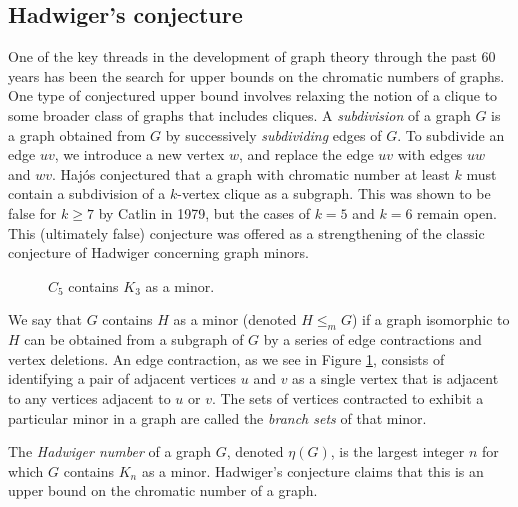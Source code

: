\subsection{Hadwiger's conjecture}

 One of the key threads in the development of graph theory through the past 60 years has been the search for upper bounds on the chromatic numbers of graphs.  One type of conjectured upper bound involves relaxing the notion of a clique to some broader class of graphs that includes cliques.  A {\it subdivision} of a graph $G$ is a graph obtained from $G$ by successively {\it subdividing} edges of $G$.  To subdivide an edge $uv$, we introduce a new vertex $w$, and replace the edge $uv$ with edges $uw$ and $wv$.  Haj\'os conjectured that a graph with chromatic number at least $k$ must contain a subdivision of a $k$-vertex clique as a subgraph.  This was shown to be false for $k \geq 7$ by Catlin \cite{Catlin} in 1979, but the cases of $k =5$ and $k=6$ remain open.  This (ultimately false) conjecture was offered as a strengthening of the classic conjecture of Hadwiger concerning graph minors.

\begin{figure}
	\begin{center}
		\hspace{2cm}
		\hspace{1.7cm}
		
		\caption{$C_5$ contains $K_3$ as a minor.}
	\label{Minor}
	\end{center}
	\end{figure}
We say that $G$ contains $H$ as a minor (denoted $H \leq_m G$) if a graph isomorphic to $H$ can be obtained from a subgraph of $G$ by a series of edge contractions and vertex deletions.  An edge contraction, as we see in Figure \ref{Minor}, consists of identifying a pair of adjacent vertices $u$ and $v$ as a single vertex that is adjacent to any vertices adjacent to $u$ or $v$.  The sets of vertices contracted to exhibit a particular minor in a graph are called the {\it branch sets} of that minor.

The {\it Hadwiger number} of a graph $G$, denoted $\eta(G)$, is the largest integer $n$ for which $G$ contains $K_n$ as a minor.  Hadwiger's conjecture \cite{hadwiger} claims that this is an upper bound on the chromatic number of a graph. 


